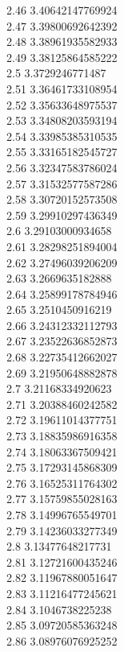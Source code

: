 {2.46	3.40642147769924\\
2.47	3.39800692642392\\
2.48	3.38961935582933\\
2.49	3.38125864585222\\
2.5	3.3729246771487\\
2.51	3.36461733108954\\
2.52	3.35633648975537\\
2.53	3.34808203593194\\
2.54	3.33985385310535\\
2.55	3.33165182545727\\
2.56	3.32347583786024\\
2.57	3.31532577587286\\
2.58	3.30720152573508\\
2.59	3.29910297436349\\
2.6	3.29103000934658\\
2.61	3.28298251894004\\
2.62	3.27496039206209\\
2.63	3.2669635182888\\
2.64	3.25899178784946\\
2.65	3.2510450916219\\
2.66	3.24312332112793\\
2.67	3.23522636852873\\
2.68	3.22735412662027\\
2.69	3.21950648882878\\
2.7	3.21168334920623\\
2.71	3.20388460242582\\
2.72	3.19611014377751\\
2.73	3.18835986916358\\
2.74	3.18063367509421\\
2.75	3.17293145868309\\
2.76	3.16525311764302\\
2.77	3.15759855028163\\
2.78	3.14996765549701\\
2.79	3.14236033277349\\
2.8	3.13477648217731\\
2.81	3.12721600435246\\
2.82	3.11967880051647\\
2.83	3.11216477245621\\
2.84	3.1046738225238\\
2.85	3.09720585363248\\
2.86	3.08976076925252\\
}
